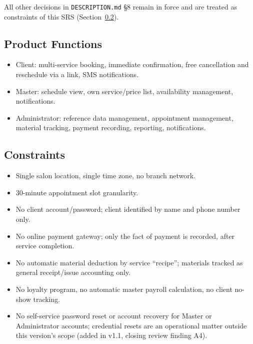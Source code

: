 \documentclass[11pt,a4paper]{article}
\begin{document}
All other decisions in \texttt{DESCRIPTION.md} \S8 remain in force and are
treated as constraints of this SRS (Section~\ref{sec:constraints}).

\subsection{Product Functions}

\begin{itemize}[leftmargin=1.2cm]

\item
Client: multi-service booking, immediate confirmation, free cancellation
and reschedule via a link, SMS notifications.

\item
Master: schedule view, own service/price list, availability management,
notifications.

\item
Administrator: reference data management, appointment management,
material tracking, payment recording, reporting, notifications.

\end{itemize}

\subsection{Constraints}
\label{sec:constraints}

\begin{itemize}[leftmargin=1.2cm]

\item Single salon location, single time zone, no branch network.

\item 30-minute appointment slot granularity.

\item No client account/password; client identified by name and phone number
only.

\item No online payment gateway; only the fact of payment is recorded,
after service completion.

\item No automatic material deduction by service ``recipe''; materials
tracked as general receipt/issue accounting only.

\item No loyalty program, no automatic master payroll calculation, no
client no-show tracking.

\item No self-service password reset or account recovery for Master or
Administrator accounts; credential resets are an operational matter
outside this version's scope (added in v1.1, closing review finding A4).

\end{itemize}
\end{document}
